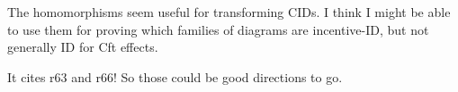 \documentclass[letterpaper,10pt]{article}
\newtheorem{definition}{Definition}
\begin{document}
The homomorphisms seem useful for transforming CIDs.
I think I might be able to use them for proving which families of diagrams are incentive-ID, but not generally ID for Cft effects.

It cites r63 and r66! So those could be good directions to go.









\end{document}
